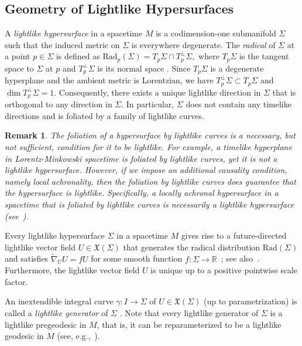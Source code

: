 \documentclass[11pt]{article}
\numberwithin{equation}{section}
\newtheorem{remark}[theorem]{Remark}
\begin{document}
	\subsection{Geometry of Lightlike Hypersurfaces}
	
	A \emph{lightlike hypersurface} in a spacetime $M$ is a codimension-one submanifold $\Sigma$ such that the induced metric on $\Sigma$ is everywhere degenerate. The \emph{radical} of $\Sigma$ at a point $p \in \Sigma$ is defined as $\mathrm{Rad}_p(\Sigma) = T_p\Sigma \cap T_p^\perp \Sigma,$ where $T_p\Sigma$ is the tangent space to $\Sigma$ at $p$ and $T_p^\perp \Sigma$ is its normal space \cite[p.~53]{oneill}. Since $T_p\Sigma$ is a degenerate hyperplane and the ambient metric is Lorentzian, we have $T_p^\perp \Sigma \subset T_p\Sigma$ and $\dim T_p^\perp \Sigma = 1$. Consequently, there exists a unique lightlike direction in $\Sigma$ that is orthogonal to any direction in $\Sigma$. In particular, $\Sigma$ does not contain any timelike directions and is foliated by a family of lightlike curves.
	
	
	
	\begin{remark} \normalfont \label{Foliation}
		The foliation of a hypersurface by lightlike curves is a necessary, but not sufficient, condition for it to be lightlike. For example, a timelike hyperplane in Lorentz-Minkowski spacetime is foliated by lightlike curves, yet it is not a lightlike hypersurface. However, if we impose an additional causality condition, namely local achronality, then the foliation by lightlike curves \emph{does} guarantee that the hypersurface is lightlike. Specifically, a locally achronal hypersurface in a spacetime that is foliated by lightlike curves is necessarily a lightlike hypersurface (see~\cite{kupeli}).
	\end{remark}
	
Every lightlike hypersurface $\Sigma$ in a spacetime $M$ gives rise to a future-directed lightlike vector field $U \in \mathfrak{X}(\Sigma)$ that generates the radical distribution $\mathrm{Rad}(\Sigma)$ and satisfies $\widetilde{\nabla}_{U} U = fU$ for some smooth function $f\colon \Sigma \to \mathbb{R}$~\cite[p.~116]{DuggalGimenez}; see also~\cite[Sec.~3]{kupeli87}. Furthermore, the lightlike vector field $U$ is unique up to a positive pointwise scale factor.
	
	An inextendible integral curve $\gamma\colon I \to \Sigma$ of $U \in \mathfrak{X}(\Sigma)$ (up to parametrization) is called a \emph{lightlike generator} of $\Sigma$ \cite{kupeli87}. 
	Note that every lightlike generator of $\Sigma$ is a lightlike pregeodesic in $M$, that is, it can be reparameterized to be a lightlike geodesic in $M$ (see, e.g.,~\cite{ MinguzziSanchez}). 
	
\end{document}
